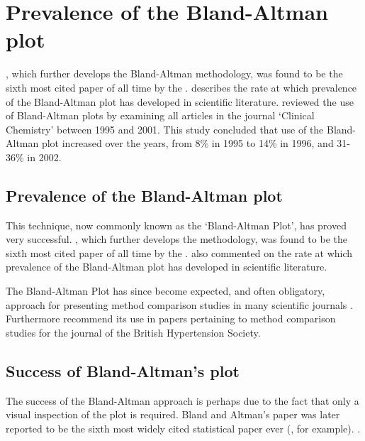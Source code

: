 \documentclass[MAIN.tex]{subfiles}
\begin{document}
\section{Prevalence of the Bland-Altman plot}

\citet*{BA86}, which further develops the Bland-Altman methodology,
was found to be the sixth most cited paper of all time by the
\citet{BAcite}. \cite{Dewitte} describes the rate at which
prevalence of the Bland-Altman plot has developed in scientific
literature. \citet{Dewitte} reviewed the use of Bland-Altman plots
by examining all articles in the journal `Clinical Chemistry'
between 1995 and 2001. This study concluded that use of the
Bland-Altman plot increased over the years, from 8\% in 1995 to
14\% in 1996, and 31-36\% in 2002.


\subsection{Prevalence of the Bland-Altman plot}
This technique, now commonly known as the `Bland-Altman Plot', has proved very successful.
\citet*{BA86}, which further develops the methodology, was found to be the sixth most cited paper of all time by the
	\citet{BAcite}. \cite{Dewitte} also commented on the rate at which prevalence of the Bland-Altman plot has developed in scientific
	literature. 
	
The Bland-Altman Plot has since become expected, and often obligatory, approach for presenting method comparison
	studies in many scientific journals \citep{Hollis}. Furthermore	\citet{BritHypSoc} recommend its use in papers pertaining to
	method comparison studies for the journal of the British Hypertension Society.
	


	




\subsection{Success of Bland-Altman’s plot}
The success of the Bland-Altman approach is perhaps due to the fact that only a visual inspection of the plot is required. Bland and Altman’s paper was later reported to be the sixth most widely cited statistical paper ever (\citet{Hollis}, for example). \citet{ryanwoodall}. 
\end{document}
